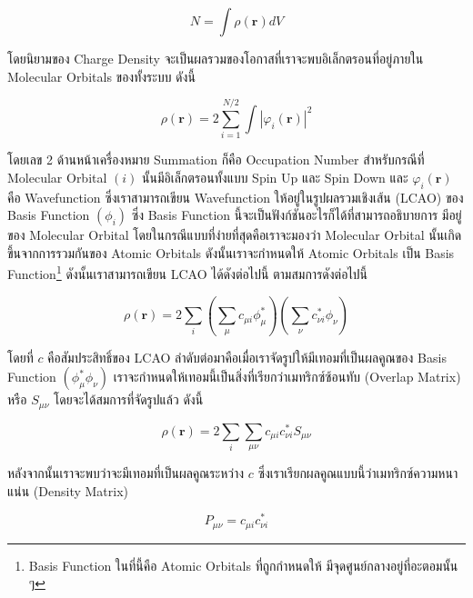 \begin{equation}
    N = \int \rho(\bm{r}) dV
\end{equation}

โดยนิยามของ Charge Density จะเป็นผลรวมของโอกาสที่เราจะพบอิเล็กตรอนที่อยู่ภายใน Molecular Orbitals ของทั้งระบบ ดังนี้

\begin{equation}\label{eq:charge_density}
    \rho(\bm{r}) = 2 \sum^{N/2}_{i=1} \int |\varphi_{i}(\bm{r})|^{2}
\end{equation}

\noindent โดยเลข 2 ด้านหน้าเครื่องหมาย Summation ก็คือ Occupation Number สำหรับกรณีที่ Molecular Orbital $(i)$ 
นั้นมีอิเล็กตรอนทั้งแบบ Spin Up และ Spin Down และ $\varphi_{i}(\bm{r})$ คือ Wavefunction ซึ่งเราสามารถเขียน Wavefunction 
ให้อยู่ในรูปผลรวมเชิงเส้น (LCAO) ของ Basis Function $(\phi_{i})$ ซึ่ง Basis Function นี้จะเป็นฟังก์ชันอะไรก็ได้ที่สามารถอธิบายการ%
มีอยู่ของ Molecular Orbital โดยในกรณีแบบที่ง่ายที่สุดคือเราจะมองว่า Molecular Orbital นั้นเกิดขึ้นจากการรวมกันของ Atomic Orbitals 
ดังนั้นเราจะกำหนดให้ Atomic Orbitals เป็น Basis Function\footnote{Basis Function ในที่นี้คือ Atomic Orbitals ที่ถูกกำหนดให้%
มีจุดศูนย์กลางอยู่ที่อะตอมนั้น ๆ} ดังนั้นเราสามารถเขียน LCAO ได้ดังต่อไปนี้ 
ตามสมการดังต่อไปนี้

\begin{equation}
    \rho(\bm{r}) = 2 \sum_{i} \left ( \sum_{\mu} c_{\mu i} \phi_{\mu}^{*} \right ) 
    \left ( \sum_{\nu} c^{*}_{\nu i}  \phi_{\nu} \right )
\end{equation}

\noindent โดยที่ $c$ คือสัมประสิทธิ์ของ LCAO ลำดับต่อมาคือเมื่อเราจัดรูปให้มีเทอมที่เป็นผลคูณของ Basis Function $(\phi_{\mu}^{*} 
\phi_{\nu})$ เราจะกำหนดให้เทอมนี้เป็นสิ่งที่เรียกว่าเมทริกซ์ซ้อนทับ (Overlap Matrix) หรือ $S_{\mu\nu}$ โดยจะได้สมการที่จัดรูปแล้ว 
ดังนี้

\begin{equation}
    \rho(\bm{r}) = 2 \sum_{i}\sum_{\mu\nu} c_{\mu i} c^{*}_{\nu i} S_{\mu\nu}
\end{equation}

หลังจากนั้นเราจะพบว่าจะมีเทอมที่เป็นผลคูณระหว่าง $c$ ซึ่งเราเรียกผลคูณแบบนี้ว่าเมทริกซ์ความหนาแน่น (Density Matrix) 

\begin{equation}\label{eq:density_matrix}
    P_{\mu\nu} = c_{\mu i} c^{*}_{\nu i}
\end{equation}


